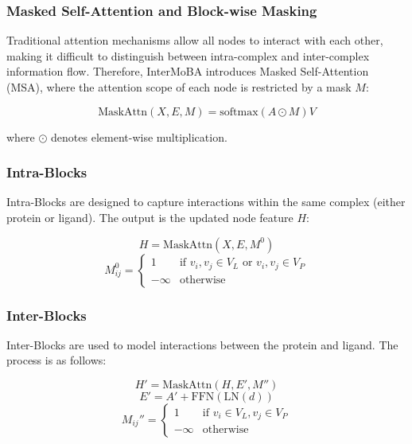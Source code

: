 \documentclass[11pt,a4paper]{article}
\begin{document}
\subsubsection{Masked Self-Attention and Block-wise Masking}
Traditional attention mechanisms allow all nodes to interact with each
other, making it difficult to distinguish between
intra-complex and inter-complex information flow. Therefore, InterMoBA
introduces Masked Self-Attention (MSA)\cite{lee2018pre}, where the attention scope of
each node is restricted by a mask $M$:

\begin{equation}
\text{MaskAttn}(X,E,M) = \text{softmax}(A \odot M)V
\end{equation}

where $\odot$ denotes element-wise multiplication.

\subsubsection{Intra-Blocks}
Intra-Blocks are designed to capture interactions within
the same complex (either protein or ligand). The output is the updated
node feature $H$:

\begin{equation}
H = \text{MaskAttn}\left( X,E,M^{0} \right)
\end{equation}
\begin{equation}
M_{ij}^{0} = 
\begin{cases} 
1 & \text{if } v_{i},v_{j} \in V_{L} \text{ or } v_{i},v_{j} \in V_{P} \\
-\infty & \text{otherwise}
\end{cases}
\end{equation}

\subsubsection{Inter-Blocks}
Inter-Blocks are used to model interactions between the protein and
ligand. The process is as follows:

\begin{equation}
H' = \text{MaskAttn}\left( H,E',M'' \right)
\end{equation}
\begin{equation}
E' = A' + \text{FFN}\left( \text{LN}(d) \right)
\end{equation}
\begin{equation}
M_{ij}'' = 
\begin{cases} 
1 & \text{if } v_{i} \in V_{L}, v_{j} \in V_{P} \\
-\infty & \text{otherwise}
\end{cases}
\end{equation}
\end{document}
